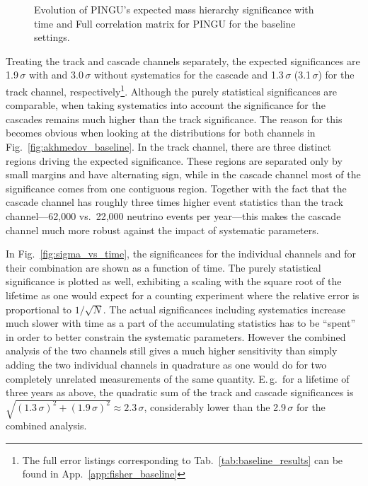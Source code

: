 \begin{figure}[thp]
 \centering
 \caption{\protect{} Evolution of PINGU's expected mass 
          hierarchy significance with time and 
          \protect{} Full correlation matrix for PINGU
          for the baseline settings.}
 \label{fig:time_covmat}
\end{figure}

Treating the track and cascade channels separately, the expected significances
are 1.9\,$\sigma$ with and 3.0\,$\sigma$ without systematics for the cascade
and 1.3\,$\sigma$ (3.1\,$\sigma$) for the track channel,
respectively\footnote{The full error listings corresponding to
Tab.~\ref{tab:baseline_results} can be found in
App.~\ref{app:fisher_baseline}}. Although the purely statistical significances
are comparable, when taking systematics into account the significance for the
cascades remains much higher than the track significance. 
The reason for this becomes obvious when looking at the \delchi distributions 
for both channels in Fig.~\ref{fig:akhmedov_baseline}. In the track channel, 
there are three distinct regions driving the expected significance. These 
regions are separated only by small margins and have alternating sign, while in 
the cascade channel most of the significance comes from one contiguous region. 
Together with the fact that the cascade channel has roughly three times higher 
event statistics than the track channel---62,000 vs.\ 22,000 neutrino events 
per year---this makes the cascade channel much more robust against the impact 
of systematic parameters.

In Fig.~\ref{fig:sigma_vs_time}, the significances for the individual channels 
and for their combination are shown as a function of time. The purely 
statistical significance is plotted as well, exhibiting a scaling with the 
square root of the lifetime as one would expect for a counting experiment where 
the relative error is proportional to $1/\sqrt{N}$. The actual significances 
including systematics increase much slower with time as a part of the 
accumulating statistics has to be ``spent'' in order to better constrain the 
systematic parameters. However the combined analysis of the two channels still 
gives a much higher sensitivity than simply adding the two individual channels 
in quadrature as one would do for two completely unrelated measurements of the 
same quantity. E.\,g.\ for a lifetime of three years as above, the quadratic 
sum of the track and cascade significances is $\sqrt{(1.3\,\sigma)^2 + 
(1.9\,\sigma)^2} \approx 2.3\,\sigma$, considerably lower than the 
2.9\,$\sigma$ for the combined analysis.

